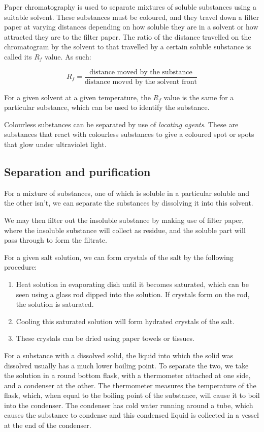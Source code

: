 Paper chromatography is used to separate mixtures of soluble substances using a suitable solvent.
These substances must be coloured, and they travel down a filter paper at varying distances
depending on how soluble they are in a solvent or how attracted they are to the filter paper. The
ratio of the distance travelled on the chromatogram by the solvent to that travelled by a certain
soluble substance is called its $R_f$ value. As such:

$$ R_f = \frac{\textrm{distance moved by the substance}}{\textrm{distance moved by the solvent front}} $$

For a given solvent at a given temperature, the $R_f$ value is the same for a particular substance,
which can be used to identify the substance.

Colourless substances can be separated by use of \textit{locating agents}. These are substances
that react with colourless substances to give a coloured spot or spots that glow under ultraviolet
light.

\subsection{Separation and purification}

For a mixture of substances, one of which is soluble in a particular soluble and the other isn't,
we can separate the substances by dissolving it into this solvent. 

We may then filter out the 
insoluble substance by making use of filter paper, where the insoluble substance will collect as
residue, and the soluble part will pass through to form the filtrate.

For a given salt solution, we can form crystals of the salt by the following procedure:
\begin{enumerate}
	\item Heat solution in evaporating dish until it becomes saturated, which can be seen using a
		glass rod dipped into the solution. If crystals form on the rod, the solution is saturated.
	\item Cooling this saturated solution will form hydrated crystals of the salt.
	\item These crystals can be dried using paper towels or tissues.
\end{enumerate}

For a substance with a dissolved solid, the liquid into which the solid was dissolved usually has
a much lower boiling point. To separate the two, we take the solution in a round bottom flask, with
a thermometer attached at one side, and a condenser at the other. The thermometer measures the
temperature of the flask, which, when equal to the boiling point of the substance, will cause it
to boil into the condenser. The condenser has cold water running around a tube, which causes the
substance to condense and this condensed liquid is collected in a vessel at the end of the 
condenser.

